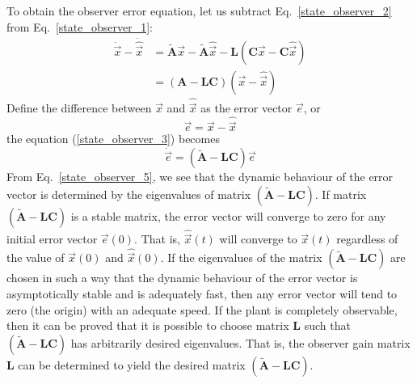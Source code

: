 \documentclass[11pt,a4paper,oneside]{book}
\numberwithin{equation}{section}
\theoremstyle{it}
\theoremstyle{definition}
\begin{document}
To obtain the observer error equation, let us subtract 
Eq.~\eqref{state_observer_2} from 
Eq.~\eqref{state_observer_1}:
\begin{equation} \label{state_observer_3}
	\begin{split}
		\dot{\vec{x}} - \dot{\hat{\vec x}} & = \tilde{\mathbf{A}}\vec x - 
		\tilde{\mathbf{A}}\hat{\vec x} - \mathbf{L}(\mathbf{C}\vec x - 
		\mathbf{C}\hat{\vec{x}}) \\
		& = (\mathbf{\mathbf{A}}-\mathbf{L}\mathbf{C})(\vec{x} - \hat{\vec{x}})
	\end{split}
\end{equation}
Define the difference between $\vec{x}$ and $\hat{\vec{x}}$ as the error vector 
$\vec{e}$, or
\begin{equation} \label{state_observer_4}
	\vec{e} = \vec{x} - \hat{\vec{x}}
\end{equation}
the equation (\ref{state_observer_3}) becomes
\begin{equation} \label{state_observer_5}
	\dot{\vec{e}} = (\tilde{\mathbf{A}}-\mathbf{LC})\vec{e}
\end{equation}
From Eq.~\eqref{state_observer_5}, we see that the dynamic behaviour of the 
error vector is 
determined by the eigenvalues of matrix $(\tilde{\mathbf{A}}-\mathbf{LC})$. If 
matrix $(\tilde{\mathbf{A}}-\mathbf{LC})$ is a stable matrix, the error vector 
will converge to zero for any initial error vector $\vec e(0)$. That is, 
$\hat{\vec x}(t)$ will 
converge to $\vec x(t)$ regardless of the value of $\vec x(0)$ and 
$\hat{\vec{x}}(0)$. If the eigenvalues of the matrix 
$(\tilde{\mathbf{A}}-\mathbf{LC})$ are chosen in such a way that the dynamic 
behaviour of the error vector is asymptotically stable and is adequately fast, 
then any error vector will tend to zero (the origin) with an adequate speed.
If the plant is completely observable, then it can be proved that it is 
possible to choose matrix $\mathbf{L}$ such that 
$(\tilde{\mathbf{A}}-\mathbf{LC})$ has 
arbitrarily desired eigenvalues. That is, the observer gain matrix $\mathbf{L}$ 
can be determined to yield the desired matrix 
$(\tilde{\mathbf{A}}-\mathbf{LC})$. 
\end{document}
